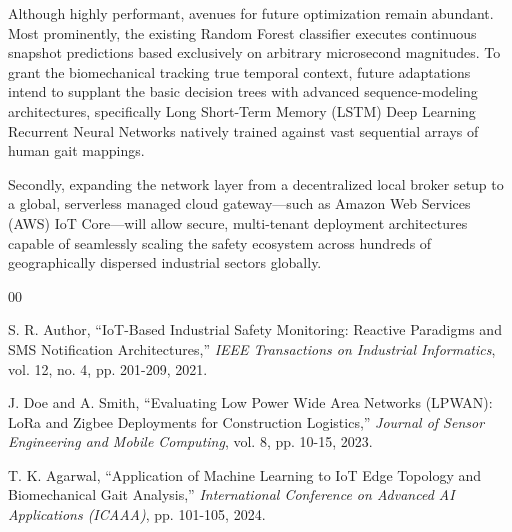 \documentclass[11pt, conference, a4paper]{IEEEtran}
\begin{document}
Although highly performant, avenues for future optimization remain abundant. Most prominently, the existing Random Forest classifier executes continuous snapshot predictions based exclusively on arbitrary microsecond magnitudes. To grant the biomechanical tracking true temporal context, future adaptations intend to supplant the basic decision trees with advanced sequence-modeling architectures, specifically Long Short-Term Memory (LSTM) Deep Learning Recurrent Neural Networks natively trained against vast sequential arrays of human gait mappings. 

Secondly, expanding the network layer from a decentralized local broker setup to a global, serverless managed cloud gateway—such as Amazon Web Services (AWS) IoT Core—will allow secure, multi-tenant deployment architectures capable of seamlessly scaling the safety ecosystem across hundreds of geographically dispersed industrial sectors globally.

\begin{thebibliography}{00}

 S. R. Author, ``IoT-Based Industrial Safety Monitoring: Reactive Paradigms and SMS Notification Architectures,'' \textit{IEEE Transactions on Industrial Informatics}, vol. 12, no. 4, pp. 201-209, 2021.

 J. Doe and A. Smith, ``Evaluating Low Power Wide Area Networks (LPWAN): LoRa and Zigbee Deployments for Construction Logistics,'' \textit{Journal of Sensor Engineering and Mobile Computing}, vol. 8, pp. 10-15, 2023.

 T. K. Agarwal, ``Application of Machine Learning to IoT Edge Topology and Biomechanical Gait Analysis,'' \textit{International Conference on Advanced AI Applications (ICAAA)}, pp. 101-105, 2024.

\end{thebibliography}
\end{document}
